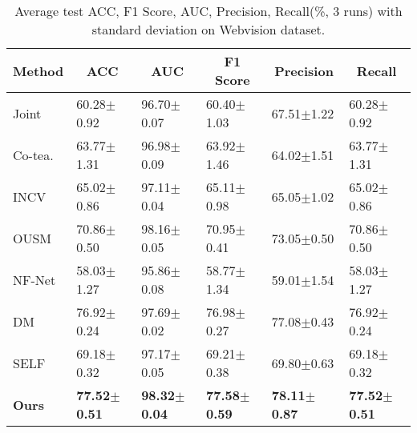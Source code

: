 \begin{table}[]
\scriptsize
\centering
\caption{{Average test ACC, F1 Score, AUC, {Precision}, Recall(\%, 3 runs) with standard deviation on Webvision dataset.}}
\label{table:objWebvision}
\begin{tabular}{@{}llllll@{}}
\toprule
Method & \multicolumn{1}{c}{ACC} & \multicolumn{1}{c}{AUC} & \multicolumn{1}{c}{F1 Score} & \multicolumn{1}{c}{{Precision}} & \multicolumn{1}{c}{Recall} \\ \midrule
Joint      & 60.28$\pm$0.92             & 96.70$\pm$0.07             & 60.40$\pm$1.03                  & 67.51$\pm$1.22             & 60.28$\pm$0.92                \\
Co-tea.      & 63.77$\pm$1.31             & 96.98$\pm$0.09             & 63.92$\pm$1.46                  & 64.02$\pm$1.51             & 63.77$\pm$1.31                \\
INCV             & 65.02$\pm$0.86             & 97.11$\pm$0.04             & 65.11$\pm$0.98                  & 65.05$\pm$1.02             & 65.02$\pm$0.86                \\
OUSM        & 70.86$\pm$0.50             & 98.16$\pm$0.05             & 70.95$\pm$0.41                  & 73.05$\pm$0.50             & 70.86$\pm$0.50                \\
NF-Net           & 58.03$\pm$1.27             & 95.86$\pm$0.08             & 58.77$\pm$1.34                  & 59.01$\pm$1.54             & 58.03$\pm$1.27                \\
DM        & 76.92$\pm$0.24             & 97.69$\pm$0.02             & 76.98$\pm$0.27                  & 77.08$\pm$0.43             & 76.92$\pm$0.24                \\
SELF             & 69.18$\pm$0.32             & 97.17$\pm$0.05             & 69.21$\pm$0.38                  & 69.80$\pm$0.63             & 69.18$\pm$0.32                \\
\textbf{Ours}    & \textbf{77.52$\pm$0.51}    & \textbf{98.32$\pm$0.04}    & \textbf{77.58$\pm$0.59}         & \textbf{78.11$\pm$0.87}    & \textbf{77.52$\pm$0.51}       \\ \bottomrule
\end{tabular}
\end{table}

